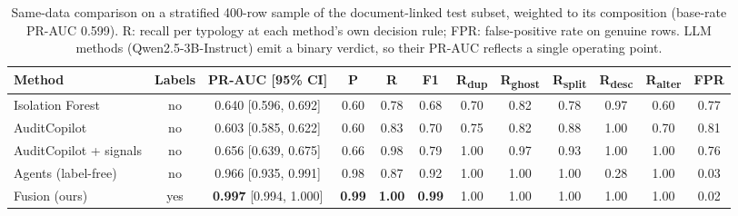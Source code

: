 \documentclass{article}
\begin{document}
\begin{table}[t]
  \caption{Same-data comparison on a stratified 400-row sample of the document-linked test subset, weighted to its composition (base-rate PR-AUC 0.599). R: recall per typology at each method's own decision rule; FPR: false-positive rate on genuine rows. LLM methods (Qwen2.5-3B-Instruct) emit a binary verdict, so their PR-AUC reflects a single operating point.}
  \label{tab:comparison}
  \centering
  \small
  \setlength{\tabcolsep}{3.5pt}
  \begin{tabular}{lccccccccccc}
    \toprule
    Method & Labels & PR-AUC [95\% CI] & P & R & F1 & R\textsubscript{dup} & R\textsubscript{ghost} & R\textsubscript{split} & R\textsubscript{desc} & R\textsubscript{alter} & FPR \\
    \midrule
    Isolation Forest      & no  & 0.640 [0.596, 0.692] & 0.60 & 0.78 & 0.68 & 0.70 & 0.82 & 0.78 & 0.97 & 0.60 & 0.77 \\
    AuditCopilot          & no  & 0.603 [0.585, 0.622] & 0.60 & 0.83 & 0.70 & 0.75 & 0.82 & 0.88 & 1.00 & 0.70 & 0.81 \\
    AuditCopilot + signals & no & 0.656 [0.639, 0.675] & 0.66 & 0.98 & 0.79 & 1.00 & 0.97 & 0.93 & 1.00 & 1.00 & 0.76 \\
    Agents (label-free)   & no  & 0.966 [0.935, 0.991] & 0.98 & 0.87 & 0.92 & 1.00 & 1.00 & 1.00 & 0.28 & 1.00 & 0.03 \\
    Fusion (ours)         & yes & \textbf{0.997} [0.994, 1.000] & \textbf{0.99} & \textbf{1.00} & \textbf{0.99} & 1.00 & 1.00 & 1.00 & 1.00 & 1.00 & 0.02 \\
    \bottomrule
  \end{tabular}
\end{table}
\end{document}
